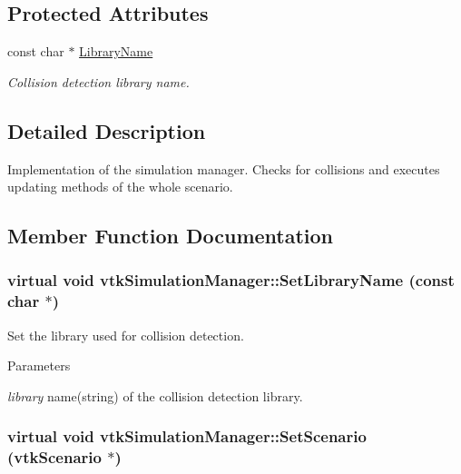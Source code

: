 \subsection*{Protected Attributes}
\begin{DoxyCompactItemize}
\item 
\hypertarget{classvtkSimulationManager_a10110ebaa8053f5ff70df73618d3d677}{
const char $\ast$ \hyperlink{classvtkSimulationManager_a10110ebaa8053f5ff70df73618d3d677}{LibraryName}}
\label{classvtkSimulationManager_a10110ebaa8053f5ff70df73618d3d677}

\begin{DoxyCompactList}\small\item\em Collision detection library name. \item\end{DoxyCompactList}\end{DoxyCompactItemize}


\subsection{Detailed Description}
Implementation of the simulation manager. Checks for collisions and executes updating methods of the whole scenario. 

\subsection{Member Function Documentation}
\hypertarget{classvtkSimulationManager_acea563e70de3bad3bb963c570be7ed3f}{
\subsubsection[{SetLibraryName}]{\setlength{\rightskip}{0pt plus 5cm}virtual void vtkSimulationManager::SetLibraryName (const char $\ast$)}}
\label{classvtkSimulationManager_acea563e70de3bad3bb963c570be7ed3f}


Set the library used for collision detection. 


\begin{DoxyParams}{Parameters}
\item[{\em library}]name(string) of the collision detection library. \end{DoxyParams}
\hypertarget{classvtkSimulationManager_a823e52926781301387627efed3d2c592}{
\subsubsection[{SetScenario}]{\setlength{\rightskip}{0pt plus 5cm}virtual void vtkSimulationManager::SetScenario ({\bf vtkScenario} $\ast$)}}
\label{classvtkSimulationManager_a823e52926781301387627efed3d2c592}


